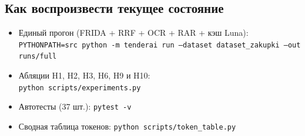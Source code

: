 \documentclass[11pt,a4paper]{article}
\begin{document}
\subsection*{Как воспроизвести текущее состояние}

\begin{itemize}
  \item Единый прогон (FRIDA + RRF + OCR + RAR + кэш Luna):\\ \texttt{PYTHONPATH=src python -m tenderai run --dataset dataset\_zakupki --out runs/full}
  \item Абляции H1, H2, H3, H6, H9 и H10:\\ \texttt{python scripts/experiments.py}
  \item Автотесты (37 шт.): \texttt{pytest -v}
  \item Сводная таблица токенов: \texttt{python scripts/token\_table.py}
\end{itemize}
\end{document}
